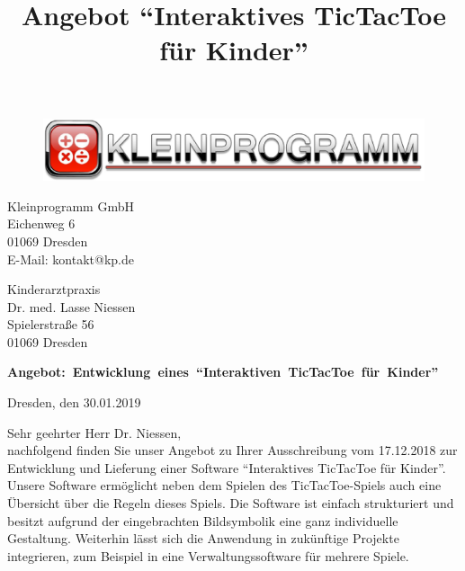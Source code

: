\documentclass[12pt]{article}
\title{Angebot "`Interaktives TicTacToe für Kinder"'}
\begin{document}
\begin{center}
\begin{figure}
\includegraphics[scale=0.9]{banner.pdf}
\end{figure}
\end{center}

\small
\begin{flushright}
Kleinprogramm GmbH\\
Eichenweg 6\\
01069 Dresden\\ 
E-Mail: kontakt@kp.de
\end{flushright}


Kinderarztpraxis\\ Dr. med. Lasse Niessen\\
Spielerstraße 56\\
01069 Dresden\\

\vspace*{10mm}

\large \textbf{Angebot:\ Entwicklung\ eines\ "`Interaktiven\ TicTacToe\ für\ Kinder"'}

\normalsize
\begin{flushright}
Dresden, den 30.01.2019\\
\end{flushright}

\vspace*{7mm}

Sehr geehrter Herr Dr. Niessen,\\

nachfolgend finden Sie unser Angebot zu Ihrer Ausschreibung vom 17.12.2018 zur Entwicklung und Lieferung einer Software "`Interaktives TicTacToe für Kinder"'.\\

Unsere Software ermöglicht neben dem Spielen des TicTacToe-Spiels auch eine Übersicht über die Regeln dieses Spiels. Die Software ist einfach strukturiert und besitzt aufgrund der eingebrachten Bildsymbolik eine ganz individuelle Gestaltung. Weiterhin lässt sich die Anwendung in zukünftige Projekte integrieren, zum Beispiel in eine Verwaltungssoftware für mehrere Spiele.
\end{document}

